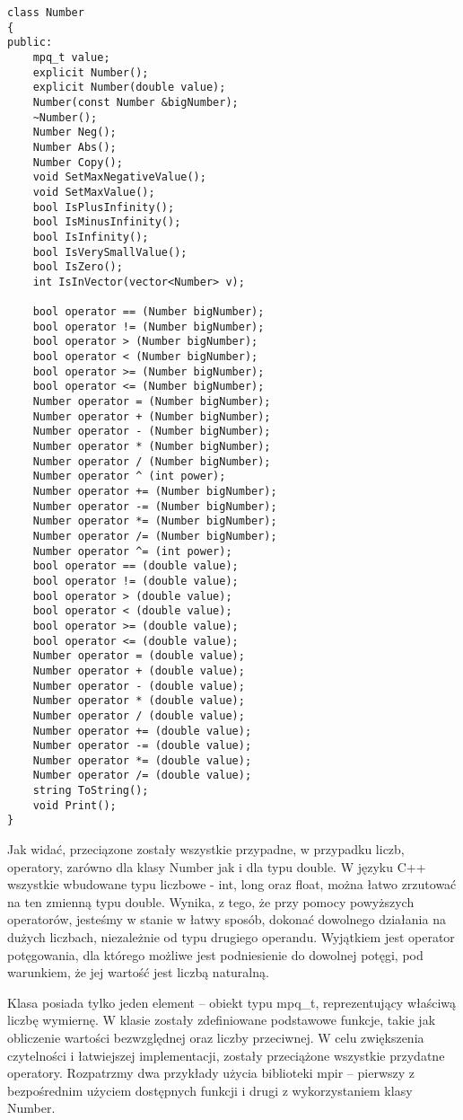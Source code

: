 \documentclass[twoside,a4paper]{book}
\begin{document}
\begin{lstlisting}
class Number
{
public:
	mpq_t value;
	explicit Number();
	explicit Number(double value);
	Number(const Number &bigNumber);
	~Number();
	Number Neg();
	Number Abs();
	Number Copy();
	void SetMaxNegativeValue();
	void SetMaxValue();
	bool IsPlusInfinity();
	bool IsMinusInfinity();
	bool IsInfinity();
	bool IsVerySmallValue();
	bool IsZero();
	int IsInVector(vector<Number> v);
	
	bool operator == (Number bigNumber);
	bool operator != (Number bigNumber);
	bool operator > (Number bigNumber);
	bool operator < (Number bigNumber);
	bool operator >= (Number bigNumber);
	bool operator <= (Number bigNumber);
	Number operator = (Number bigNumber);
	Number operator + (Number bigNumber);
	Number operator - (Number bigNumber);
	Number operator * (Number bigNumber);
	Number operator / (Number bigNumber);
	Number operator ^ (int power);
	Number operator += (Number bigNumber);
	Number operator -= (Number bigNumber);
	Number operator *= (Number bigNumber);
	Number operator /= (Number bigNumber);
	Number operator ^= (int power);
	bool operator == (double value);
	bool operator != (double value);
	bool operator > (double value);
	bool operator < (double value);
	bool operator >= (double value);
	bool operator <= (double value);
	Number operator = (double value);
	Number operator + (double value);
	Number operator - (double value);
	Number operator * (double value);
	Number operator / (double value);
	Number operator += (double value);
	Number operator -= (double value);
	Number operator *= (double value);
	Number operator /= (double value);
	string ToString();
	void Print();
}
\end{lstlisting}

Jak widać, przeciązone zostały wszystkie przypadne, w przypadku liczb, operatory, zarówno dla klasy Number jak i dla typu double. W języku C++ wszystkie wbudowane typu liczbowe - int, long oraz float, można łatwo zrzutować na ten zmienną typu double. Wynika, z tego, że przy pomocy powyższych operatorów, jesteśmy w stanie w łatwy sposób, dokonać dowolnego działania na dużych liczbach, niezależnie od typu drugiego operandu. Wyjątkiem jest operator potęgowania, dla którego możliwe jest podniesienie do dowolnej potęgi, pod warunkiem, że jej wartość jest liczbą naturalną.

Klasa posiada tylko jeden element – obiekt typu mpq\_t, reprezentujący właściwą liczbę wymiernę. W klasie zostały zdefiniowane podstawowe funkcje, takie jak obliczenie wartości bezwzględnej oraz liczby przeciwnej. W celu zwiększenia czytelności i łatwiejszej implementacji, zostały przeciążone wszystkie przydatne operatory. Rozpatrzmy dwa przykłady użycia biblioteki mpir – pierwszy z bezpośrednim użyciem dostępnych funkcji i drugi z wykorzystaniem klasy Number.
\end{document}
